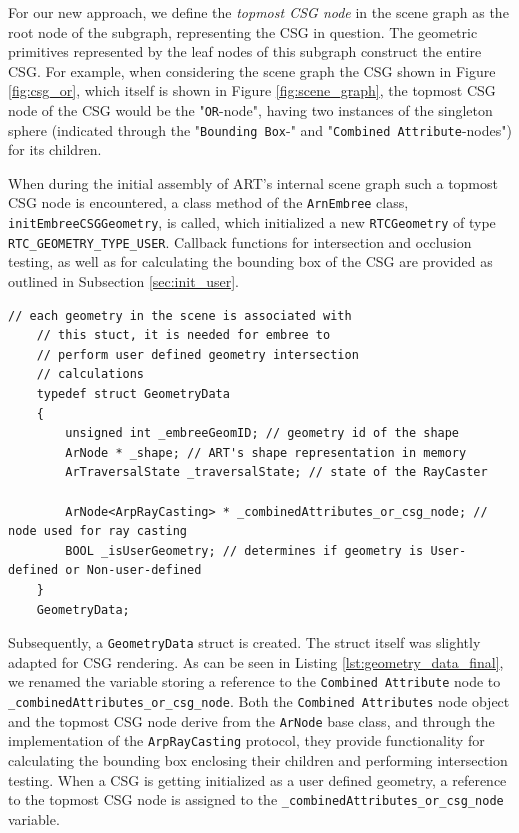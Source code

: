 For our new approach, we define the \emph{topmost CSG node} in the scene graph as the root node of the subgraph, representing the CSG in question. The geometric primitives represented by the leaf nodes of this subgraph construct the entire CSG. For example, when considering the scene graph the CSG shown in Figure \ref{fig:csg_or}, which itself is shown in Figure \ref{fig:scene_graph}, the topmost CSG node of the CSG would be the "\texttt{OR}-node", having two instances of the singleton sphere (indicated through the "\texttt{Bounding Box}-" and "\texttt{Combined Attribute}-nodes") for its children.

When during the initial assembly of ART's internal scene graph such a topmost CSG node is encountered, a class method of the \texttt{ArnEmbree} class, \texttt{initEmbreeCSGGeometry}, is called, which initialized a new \texttt{RTCGeometry} of type \texttt{RTC\_GEOMETRY\_TYPE\_USER}. 
Callback functions for intersection and occlusion testing, as well as for calculating the bounding box of the CSG are provided as outlined in Subsection \ref{sec:init_user}. 


\begin{listing} 
	\begin{lstlisting}[caption={Updated \texttt{GeometryData} struct for CSG rendering.}, label={lst:geometry_data_final}]
	// each geometry in the scene is associated with
	// this stuct, it is needed for embree to
	// perform user defined geometry intersection
	// calculations
	typedef struct GeometryData 
	{
		unsigned int _embreeGeomID; // geometry id of the shape
		ArNode * _shape; // ART's shape representation in memory
		ArTraversalState _traversalState; // state of the RayCaster
		
		ArNode<ArpRayCasting> * _combinedAttributes_or_csg_node; // node used for ray casting
		BOOL _isUserGeometry; // determines if geometry is User-defined or Non-user-defined
	}
	GeometryData;
	\end{lstlisting}
\end{listing}

Subsequently, a \texttt{GeometryData} struct is created. The struct itself was slightly adapted for CSG rendering. As can be seen in Listing \ref{lst:geometry_data_final}, we renamed the variable storing a reference to the \texttt{Combined Attribute} node to \texttt{\_combinedAttributes\_or\_csg\_node}. Both the \texttt{Combined Attributes} node object and the topmost CSG node derive from the \texttt{ArNode} base class, and through the implementation of the \texttt{ArpRayCasting} protocol, they provide functionality for calculating the bounding box enclosing their children and performing intersection testing.
When a CSG is getting initialized as a user defined geometry, a reference to the topmost CSG node is assigned to the
\texttt{\_combinedAttributes\_or\_csg\_node} variable.

